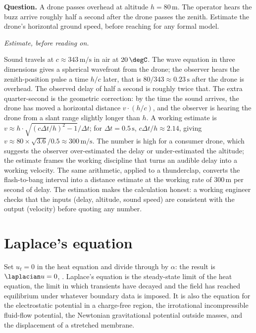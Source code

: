 \begin{estimation}
\textbf{Question.} A drone passes overhead at altitude
$h = 80\,\si{\meter}$. The operator hears the buzz arrive
roughly half a second after the drone passes the zenith. Estimate
the drone's horizontal ground speed, before reaching for any
formal model.

\smallskip
\textit{Estimate, before reading on.}

\smallskip
Sound travels at $c \approx 343\,\si{\meter\per\second}$ in air at
$20\,\degC$. The wave equation in three dimensions gives a
spherical wavefront from the drone; the observer hears the
zenith-position pulse a time $h/c$ later, that is $80/343 \approx
0.23\,\si{\second}$ after the drone is overhead. The observed
delay of half a second is roughly twice that. The extra
quarter-second is the geometric correction: by the time the sound
arrives, the drone has moved a horizontal distance $v \cdot
(h/c)$, and the observer is hearing the drone from a slant
range slightly longer than $h$. A working estimate is
$v \approx h \cdot \sqrt{(c \Delta t / h)^{2} - 1} / \Delta t$;
for $\Delta t = 0.5\,\si{\second}$, $c \Delta t / h \approx 2.14$,
giving $v \approx 80 \times \sqrt{3.6}/0.5 \approx
300\,\si{\meter\per\second}$. The number is high for a consumer
drone, which suggests the observer over-estimated the delay or
under-estimated the altitude; the estimate frames the working
discipline that turns an audible delay into a working velocity.
The same arithmetic, applied to a thunderclap, converts the
flash-to-bang interval into a distance estimate at the
working rate of $300\,\si{\meter}$ per second of delay. The
estimation makes the calculation honest: a working engineer
checks that the inputs (delay, altitude, sound speed) are
consistent with the output (velocity) before quoting any
number.
\end{estimation}

\section{Laplace's equation}

Set $u_{t} = 0$ in the heat equation and divide through by
$\alpha$: the result is $\laplacian u = 0$, . Laplace's equation is the steady-state limit of the
heat equation, the limit in which transients have decayed and the
field has reached equilibrium under whatever boundary data is
imposed. It is also the equation for the electrostatic potential
in a charge-free region, the irrotational incompressible
fluid-flow potential, the Newtonian gravitational potential
outside masses, and the displacement of a stretched membrane.

